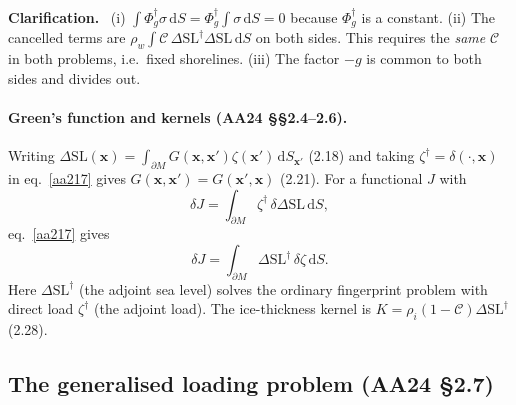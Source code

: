 \documentclass[11pt,a4paper]{article}
\newcommand{\bx}{\mathbf{x}}
\newcommand{\dSL}{\Delta\mathrm{SL}}
\newcommand{\oc}{\mathcal{C}}
\newcommand{\dd}{\,\mathrm{d}}
\newcommand{\pM}{\partial M}
\renewenvironment{leftbar}{%
  \def\FrameCommand{{\color{clarbar}\vrule width 2.5pt}\hspace{8pt}}%
  \MakeFramed{\advance\hsize-\width\FrameRestore}}%
  {\endMakeFramed}
\newenvironment{clar}{\begin{leftbar}\small\noindent\textbf{Clarification.}\ }{\end{leftbar}}
\begin{document}
\begin{clar}
(i) $\int\Phi_g^\dagger\sigma\dd S=\Phi_g^\dagger\int\sigma\dd S=0$ because $\Phi_g^\dagger$ is a
constant. (ii) The cancelled terms are
$\rho_w\int\oc\,\dSL^\dagger\dSL\dd S$ on both sides. This requires the \emph{same} $\oc$ in both
problems, i.e.\ fixed shorelines. (iii) The factor $-g$ is common to both sides and divides out.
\end{clar}

\paragraph{Green's function and kernels (AA24 \S\S2.4--2.6).} Writing
$\dSL(\bx)=\int_{\pM}G(\bx,\bx')\zeta(\bx')\dd S_{\bx'}$ (2.18) and taking $\zeta^\dagger=\delta(\cdot,\bx)$
in eq.~\eqref{aa217} gives $G(\bx,\bx')=G(\bx',\bx)$ (2.21). For a functional $J$ with
\begin{equation}
  \delta J=\int_{\pM}\zeta^\dagger\,\delta\dSL\dd S,
  \tag{2.25}
\end{equation}
eq.~\eqref{aa217} gives
\begin{equation}
  \delta J=\int_{\pM}\dSL^\dagger\,\delta\zeta\dd S .
  \tag{2.26}
\end{equation}
Here $\dSL^\dagger$ (the adjoint sea level) solves the ordinary fingerprint problem with direct load
$\zeta^\dagger$ (the adjoint load). The ice-thickness kernel is $K=\rho_i(1-\oc)\dSL^\dagger$ (2.28).

\subsection{The generalised loading problem (AA24 \S2.7)}
\label{sec:gen_static}
\end{document}
